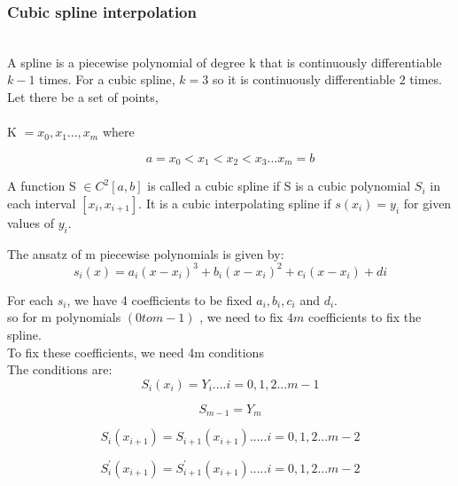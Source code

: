 \documentclass[12pt]{article}
\begin{document}
\subsubsection{Cubic spline interpolation}
\\
A spline is a piecewise polynomial of degree k that is continuously differentiable $k-1$ times. For a cubic spline, $k = 3$ so it is continuously differentiable $2$ times. \\

Let there be a set of points,\\
\\
K $= {x_0,x_1...,x_m}$ where 

\begin{equation*}
a = x_0 < x_1 < x_2 < x_3 ... x_m = b
\end{equation*}

A function S $\in C^2[a,b]$ is called a cubic spline if S is a cubic polynomial $S_i$ in each interval $[x_i,x_{i+1}]$. It is a cubic interpolating spline if $s(x_i) = y_i$ for given values of $y_i$.

The ansatz of m piecewise polynomials is given by:
\begin{equation*}
s_i(x) = a_i (x-x_i) ^3 + b_i (x-x_i) ^2 + c_i (x-x_i) + di
\end{equation*}

For each $s_i$, we have 4 coefficients to be fixed $a_i, b_i, c_i$ and $d_i$.\\
so for m polynomials $(0 to m-1)$ , we need to fix $4m$ coefficients to fix the spline.\\

To fix these coefficients, we need 4m conditions \\
The conditions are: 
\begin{equation}
S_i(x_i) = Y_i    ....   i = 0,1,2... m-1
\end{equation}

\begin{equation}
S_{m-1} = Y_m
\end{equation}

\begin{equation}
S_i(x_{i+1}) = S_{i+1}(x_{i+1})   ..... i = 0,1,2... m-2
\end{equation}

\begin{equation}
S_i ^{'}(x_{i+1}) = S^{'} _{i+1}(x_{i+1})   ..... i = 0,1,2... m-2
\end{equation}
\end{document}
